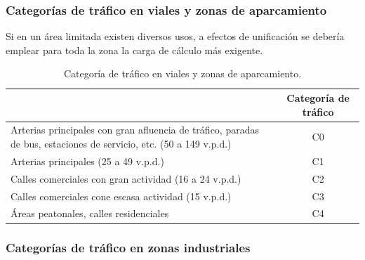 \documentclass[12pt,titlepage,openright]{report}
\begin{document}
\subsubsection{Categorías de tráfico en viales y zonas de aparcamiento}

Si en un área limitada existen diversos usos, a efectos de unificación se debería emplear para toda la zona la carga de cálculo más exigente.

\begin{table}[!htb]
\centering
\begin{tabular}{|p{7cm}|c|}
\hline
\centering{Uso previsto} & Categoría de tráfico\\ \hline
Arterias principales con gran afluencia de tráfico, paradas de bus, estaciones de servicio, etc. (50 a 149 v.p.d.) & C0\\ \hline
Arterias principales (25 a 49 v.p.d.) & C1\\ \hline
Calles comerciales con gran actividad (16 a 24 v.p.d.) & C2\\ \hline
Calles comerciales cone escasa actividad (15 v.p.d.) & C3\\ \hline
Áreas peatonales, calles residenciales & C4\\ \hline
\end{tabular}
\caption{Categoría de tráfico en viales y zonas de aparcamiento.}
\label{categoriadetraficoenviales}
\end{table}


\subsubsection{Categorías de tráfico en zonas industriales}
\end{document}
